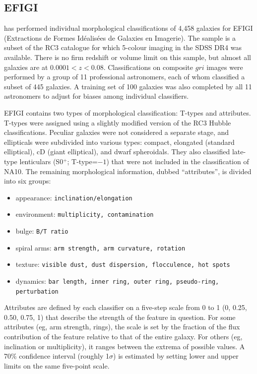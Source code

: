 \documentclass[useAMS,usenatbib]{mn2e}
\begin{document}
\subsection{EFIGI}

\citet{bai11} has performed individual morphological classifications of 4,458 galaxies for EFIGI (Extractions de Formes Id\'ealis\'ees de Galaxies en Imagerie). The sample is a subset of the RC3 catalogue for which 5-colour imaging in the SDSS DR4 was available. There is no firm redshift or volume limit on this sample, but almost all galaxies are at $0.0001<z<0.08$. Classifications on composite $gri$ images were performed by a group of 11 professional astronomers, each of whom classified a subset of 445 galaxies. A training set of 100 galaxies was also completed by all 11 astronomers to adjust for biases among individual classifiers. 

EFIGI contains two types of morphological classification: T-types and attributes. T-types were assigned using a slightly modified version of the RC3 Hubble classifications. Peculiar galaxies were not considered a separate stage, and ellipticals were subdivided into various types: compact, elongated (standard elliptical), cD (giant elliptical), and dwarf spheroidals. They also classified late-type lenticulars (S0$^+$; T-type=$-1$) that were not included in the classification of NA10. The remaining morphological information, dubbed ``attributes'', is divided into six groups:

\begin{itemize}
	\item appearance: {\tt inclination/elongation }
	\item environment: {\tt multiplicity, contamination}
	\item bulge: {\tt B/T ratio}
	\item spiral arms: {\tt arm strength, arm curvature, rotation}
	\item texture: {\tt visible dust, dust dispersion, flocculence, hot spots}
	\item dynamics: {\tt bar length, inner ring, outer ring, pseudo-ring, perturbation}
\end{itemize}

\noindent Attributes are defined by each classifier on a five-step scale from 0 to 1 (0, 0.25, 0.50, 0.75, 1) that describe the strength of the feature in question. For some attributes (eg, arm strength, rings), the scale is set by the fraction of the flux contribution of the feature relative to that of the entire galaxy. For others (eg, inclination or multiplicity), it ranges between the extrema of possible values. A 70\% confidence interval (roughly 1$\sigma$) is estimated by setting lower and upper limits on the same five-point scale.
\end{document}
